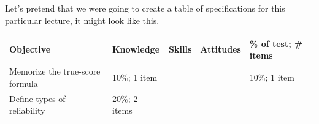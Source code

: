 \documentclass[
  english,
]{book}
\begin{document}
Let's pretend that we were going to create a table of specifications for this particular lecture, it might look like this.

\begin{longtable}[]{@{}lllll@{}}
\toprule
\begin{minipage}[b]{0.37\columnwidth}\raggedright
Objective\strut
\end{minipage} & \begin{minipage}[b]{0.11\columnwidth}\raggedright
Knowledge\strut
\end{minipage} & \begin{minipage}[b]{0.10\columnwidth}\raggedright
Skills\strut
\end{minipage} & \begin{minipage}[b]{0.10\columnwidth}\raggedright
Attitudes\strut
\end{minipage} & \begin{minipage}[b]{0.17\columnwidth}\raggedright
\% of test; \# items\strut
\end{minipage}\tabularnewline
\midrule
\endhead
\begin{minipage}[t]{0.37\columnwidth}\raggedright
Memorize the true-score formula\strut
\end{minipage} & \begin{minipage}[t]{0.11\columnwidth}\raggedright
10\%; 1 item\strut
\end{minipage} & \begin{minipage}[t]{0.10\columnwidth}\raggedright
\strut
\end{minipage} & \begin{minipage}[t]{0.10\columnwidth}\raggedright
\strut
\end{minipage} & \begin{minipage}[t]{0.17\columnwidth}\raggedright
10\%; 1 item\strut
\end{minipage}\tabularnewline
\begin{minipage}[t]{0.37\columnwidth}\raggedright
Define types of reliability\strut
\end{minipage} & \begin{minipage}[t]{0.11\columnwidth}\raggedright
20\%; 2 items\strut
\end{minipage} & \begin{minipage}[t]{0.10\columnwidth}\raggedright
\strut
\end{minipage} & \begin{minipage}[t]{0.10\columnwidth}\raggedright
\strut
\end{minipage} & \begin{minipage}[t]{0.17\columnwidth}\raggedright

\end{minipage}
\end{longtable}
\end{document}
